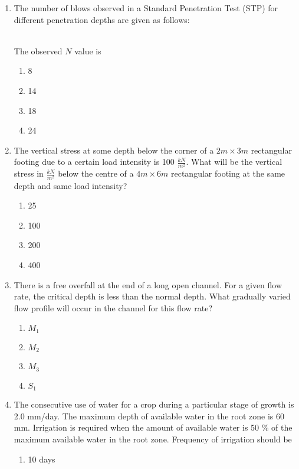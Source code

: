 \documentclass[journal]{IEEEtran}
\begin{document}
\begin{enumerate}
\begin{enumerate}
		\end{enumerate}
	\item
	The number of blows observed in a Standard Penetration Test (STP) for different penetration depths are given as follows: \\
	\begin{table}[h!]    	
    		\centering
    		 
       \end{table}
	\\
	The observed $N$ value is
		\begin{enumerate}
			\item 8
			\item 14
			\item 18
			\item 24
		\end{enumerate}
	\item
	The vertical stress at some depth below the corner of a $2m \times 3m$ rectangular footing due to a certain load intensity is 100 $\frac{kN}{m^2}$. What will be the vertical stress in $\frac{kN}{m^2}$ below the centre of a $4m \times 6m$ rectangular footing at the same depth and same load intensity?
		\begin{enumerate}
			\item 25
			\item 100
			\item 200
			\item 400
		\end{enumerate}
	\item
	There is a free overfall at the end of a long open channel. For a given flow rate, the critical depth is less than the normal depth. What gradually varied flow profile will occur in the channel for this flow rate?
		\begin{enumerate}
			\item $M_1$
			\item $M_2$
			\item $M_3$
			\item $S_1$
		\end{enumerate}
	\item
	The consecutive use of water for a crop during a particular stage of growth is 2.0 mm/day. The maximum depth of available water in the root zone is 60 mm. Irrigation is required when the amount of available water is 50 \% of the maximum available water in the root zone. Frequency of irrigation should be
		\begin{enumerate}
			\item 10 days

\end{enumerate}
\end{enumerate}
\end{document}
